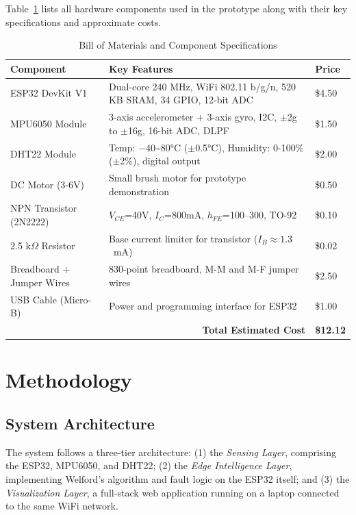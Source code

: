 \documentclass[conference]{IEEEtran}
\begin{document}
Table~\ref{tab:components} lists all hardware components used in the prototype along with their key specifications and approximate costs.

\begin{table}[H]
\centering
\caption{Bill of Materials and Component Specifications}
\label{tab:components}
\begin{tabular}{|p{2.2cm}|p{3.5cm}|p{1.2cm}|}
\hline
\textbf{Component} & \textbf{Key Features} & \textbf{Price} \\
\hline
ESP32 DevKit V1 & Dual-core 240 MHz, WiFi 802.11 b/g/n, 520 KB SRAM, 34 GPIO, 12-bit ADC & \$4.50 \\
\hline
MPU6050 Module & 3-axis accelerometer + 3-axis gyro, I2C, $\pm$2g to $\pm$16g, 16-bit ADC, DLPF & \$1.50 \\
\hline
DHT22 Module & Temp: $-40$\textasciitilde$80$°C ($\pm$0.5°C), Humidity: 0-100\% ($\pm$2\%), digital output & \$2.00 \\
\hline
DC Motor (3-6V) & Small brush motor for prototype demonstration & \$0.50 \\
\hline
NPN Transistor (2N2222) & $V_{CE}$=40V, $I_C$=800mA, $h_{FE}$=100--300, TO-92 & \$0.10 \\
\hline
2.5 k$\Omega$ Resistor & Base current limiter for transistor ($I_B \approx 1.3$~mA) & \$0.02 \\
\hline
Breadboard + Jumper Wires & 830-point breadboard, M-M and M-F jumper wires & \$2.50 \\
\hline
USB Cable (Micro-B) & Power and programming interface for ESP32 & \$1.00 \\
\hline
\multicolumn{2}{|r|}{\textbf{Total Estimated Cost}} & \textbf{\$12.12} \\
\hline
\end{tabular}
\end{table}

\section{Methodology}

\subsection{System Architecture}
The system follows a three-tier architecture: (1) the \textit{Sensing Layer}, comprising the ESP32, MPU6050, and DHT22; (2) the \textit{Edge Intelligence Layer}, implementing Welford's algorithm and fault logic on the ESP32 itself; and (3) the \textit{Visualization Layer}, a full-stack web application running on a laptop connected to the same WiFi network.
\end{document}
